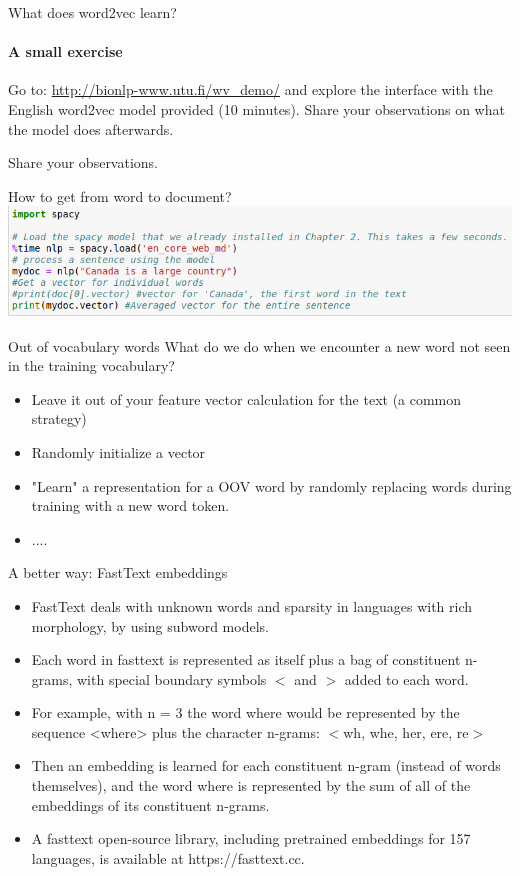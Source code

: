 \documentclass{beamer}
\begin{document}
\begin{frame}{What does word2vec learn?}
\framesubtitle{A small exercise}
    Go to: \url{http://bionlp-www.utu.fi/wv_demo/} and explore the interface with the English word2vec model provided (10 minutes). Share your observations on what the model does afterwards.
\end{frame}

\begin{frame}{}
    \large Share your observations.
\end{frame}

\begin{frame}{How to get from word to document?}
    \includegraphics[width=\textwidth]{figures/w2vavged.png}
\end{frame}

\begin{frame}{Out of vocabulary words}
What do we do when we encounter a new word not seen in the training vocabulary?
        \begin{itemize}
            \item Leave it out of your feature vector calculation for the text (a common strategy)
            \item Randomly initialize a vector
            \item "Learn" a representation for a OOV word by randomly replacing words during training with a new word token. 
            \item ....
    \end{itemize}
\end{frame}
    
\begin{frame}{A better way: FastText embeddings}
    \begin{itemize}
        \item FastText deals with unknown words and sparsity in languages with rich morphology, by using subword models. 
        \item Each word in fasttext is represented as itself plus a bag of constituent n-grams, with special boundary symbols $<$ and $>$ added to each word.
        \item For example, with n = 3 the word where would be represented by the sequence <where> plus the character n-grams: $<$wh, whe, her, ere, re$>$
        \item Then an embedding is learned for each constituent n-gram (instead of words themselves), and the word where is represented by the sum of all of the embeddings of its constituent n-grams.
        \item A fasttext open-source library, including pretrained embeddings for 157 languages,
is available at https://fasttext.cc.
    \end{itemize}
\end{frame}
\end{document}
